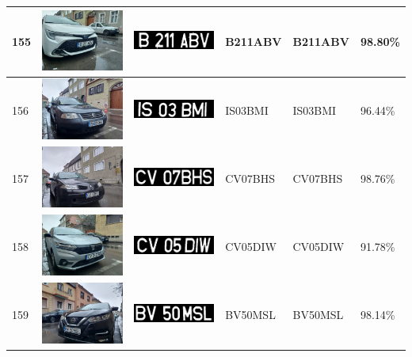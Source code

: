 \documentclass[a4paper,12pt]{report}
\begin{document}
\begin{longtable}{| m{0.6cm} | m{3cm} | m{3cm} | m{1.8cm} | m{1.8cm} | m{1.8cm} |}
        155 & \includegraphics[width=3cm,keepaspectratio]{dataset/92_s1.jpg} & \includegraphics[width=3cm,keepaspectratio]{segmentari/155.jpg} & B211ABV & B211ABV & 98.80\% \\ \hline
        156 & \includegraphics[width=3cm,keepaspectratio]{dataset/93_s1.jpg} & \includegraphics[width=3cm,keepaspectratio]{segmentari/156.jpg} & IS03BMI & IS03BMI & 96.44\% \\ \hline
        157 & \includegraphics[width=3cm,keepaspectratio]{dataset/94_s1.jpg} & \includegraphics[width=3cm,keepaspectratio]{segmentari/157.jpg} & CV07BHS & CV07BHS & 98.76\% \\ \hline
        158 & \includegraphics[width=3cm,keepaspectratio]{dataset/95_s1.jpg} & \includegraphics[width=3cm,keepaspectratio]{segmentari/158.jpg} & CV05DIW & CV05DIW & 91.78\% \\ \hline
        159 & \includegraphics[width=3cm,keepaspectratio]{dataset/96_d1.jpg} & \includegraphics[width=3cm,keepaspectratio]{segmentari/159.jpg} & BV50MSL & BV50MSL & 98.14\% \\ \hline

\end{longtable}
\end{document}
